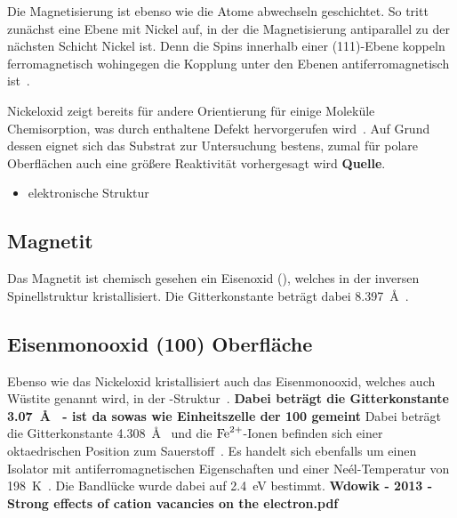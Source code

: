             Die Magnetisierung ist ebenso wie die Atome abwechseln geschichtet.
            So tritt zunächst eine Ebene mit Nickel auf, in der die Magnetisierung antiparallel zu der nächsten Schicht Nickel ist.
            Denn die Spins innerhalb einer (111)-Ebene koppeln ferromagnetisch wohingegen die Kopplung unter den Ebenen antiferromagnetisch ist~\cite{FeO_6}.

            Nickeloxid zeigt bereits für andere Orientierung für einige Moleküle Chemisorption, was durch enthaltene Defekt hervorgerufen wird~\cite{kunz_chemisorption_1985}.
            Auf Grund dessen eignet sich das Substrat zur Untersuchung bestens, zumal für polare Oberflächen auch eine größere Reaktivität vorhergesagt wird \textbf{Quelle}.
            \begin{itemize}
                \item elektronische Struktur
            \end{itemize}

        

        \subsection{Magnetit}
            Das Magnetit ist chemisch gesehen ein Eisenoxid (), welches in der inversen Spinellstruktur kristallisiert.
            Die Gitterkonstante beträgt dabei \SI{8.397}{\angstrom}~\cite{springer_database}.


        
        \subsection{Eisenmonooxid (100) Oberfläche}
            Ebenso wie das Nickeloxid kristallisiert auch das Eisenmonooxid, welches auch Wüstite genannt wird, in der -Struktur~\cite{FeO_4}.
            \textbf{Dabei beträgt die Gitterkonstante \SI{3.07}{\angstrom}~\cite{FeO_1} - ist da sowas wie Einheitszelle der 100 gemeint}
            Dabei beträgt die Gitterkonstante \SI{4.308}{\angstrom}~\cite{springer_database} und die $\ce{Fe}^{2+}$-Ionen befinden sich einer oktaedrischen Position zum Sauerstoff~\cite{FeO_4}.
            Es handelt sich ebenfalls um einen Isolator mit antiferromagnetischen Eigenschaften und einer Neél-Temperatur von \SI{198}{\kelvin}~\cite{FeO_4}.
            Die Bandlücke wurde dabei auf \SI{2.4}{\electronvolt} bestimmt. \textbf{Wdowik - 2013 - Strong effects of cation vacancies on the electron.pdf}

